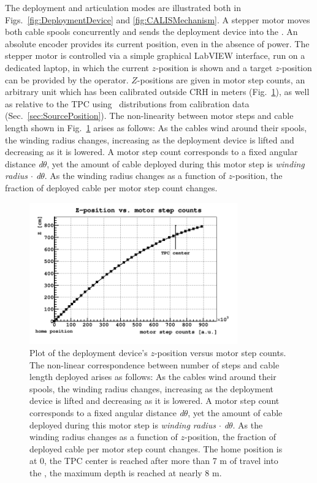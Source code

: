 The deployment and articulation modes are illustrated both in Figs.~\ref{fig:DeploymentDevice} and \ref{fig:CALISMechanism}. A stepper motor moves both cable spools concurrently and sends the deployment device into the \lsv. An absolute encoder provides its current position, even in the absence of power. The stepper motor is controlled via a simple graphical LabVIEW interface, run on a dedicated laptop, in which the current $z$-position is shown and a target $z$-position can be provided by the operator. $Z$-positions are given in motor step counts, an arbitrary unit which has been calibrated outside CRH in meters (Fig.~\ref{fig:z_test}), as well as relative to the TPC using \tdrift\ distributions from calibration data (Sec.~\ref{sec:SourcePosition}). \label{sec:Nonlinearity:MotorStepCounts}
The non-linearity between motor steps and cable length shown in Fig.~\ref{fig:z_test} arises as follows: As the cables wind around their spools, the winding radius changes, increasing as the deployment device is lifted and decreasing as it is lowered. A motor step count corresponds to a fixed angular distance \textit{d$\theta$}, yet the amount of cable deployed during this motor step is \textit{winding radius $\cdot$ d$\theta$}. As the winding radius changes as a function of $z$-position, the fraction of deployed cable per motor step count changes.

\begin{figure}[htbp]
 \centering
 \includegraphics[width=0.8\textwidth]{Figures/MSC_Z}
 \caption{Plot of the deployment device's $z$-position versus motor step counts. The non-linear correspondence between number of steps and cable length deployed arises as follows: As the cables wind around their spools, the winding radius changes, increasing as the deployment device is lifted and decreasing as it is lowered. A motor step count corresponds to a fixed angular distance \textit{d$\theta$}, yet the amount of cable deployed during this motor step is \textit{winding radius $\cdot$ d$\theta$}. As the winding radius changes as a function of $z$-position, the fraction of deployed cable per motor step count changes. The home position is at 0, the TPC center is reached after more than 7 m of travel into the \lsv, the maximum depth is reached at nearly 8 m.}
 \label{fig:z_test}
\end{figure}


